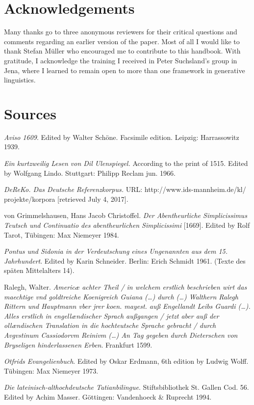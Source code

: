 \documentclass[output=paper
                ,modfonts
                ,nonflat
	        ,collection
	        ,collectionchapter
	        ,collectiontoclongg
 	        ,biblatex
                ,babelshorthands
                ,newtxmath
                ,draftmode
                ,colorlinks, citecolor=brown
]{./langsci/langscibook}
\begin{document}
\section*{Acknowledgements}
Many thanks go to three anonymous reviewers for their critical questions and comments regarding an earlier version of the paper. Most of all I would like to thank Stefan Müller who encouraged me to contribute to this handbook. With gratitude, I acknowledge the training I received in Peter Suchsland's group in Jena, where I learned to remain open to more than one framework in generative linguistics.

\section*{Sources}
\begin{description}
\setlength{\itemsep}{0pt}
\item \textit{Aviso 1609}. Edited by Walter Schöne. Facsimile edition. Leipzig: Harrassowitz 1939.
\item \textit{Ein kurtzweilig Lesen von Dil Ulenspiegel.} According to the print of 1515. Edited by Wolfgang Lindo. Stuttgart: Philipp Reclam jun. 1966.
\item \textit{DeReKo. Das Deutsche Referenzkorpus.} URL: http://www.ids-mannheim.de/kl/\\projekte/korpora [retrieved July 4, 2017].
\item von Grimmelshausen, Hans Jacob Christoffel. \textit{Der Abentheurliche Simplicissimus Teutsch und Continuatio des abentheurlichen Simplicissimi} [1669]. Edited by Rolf Tarot, Tübingen: Max Niemeyer 1984.
\item \textit{Pontus und Sidonia in der Verdeutschung eines Ungenannten aus dem 15. Jahrhundert}. Edited by Karin Schneider. Berlin: Erich Schmidt 1961. (Texte des späten Mittelalters 14).
\item Ralegh, Walter. \textit{Americæ achter Theil / in welchem erstlich beschrieben wirt das maechtige vnd goldtreiche Koenigreich Guiana (\dots) durch (\dots) Walthern Ralegh Rittern und Hauptmann vber jrer koen. mayest. auß Engellandt Leibs Guardi (\dots). Alles erstlich in engellændischer Sprach außgangen / jetzt aber auß der ollændischen Translation in die hochteutsche Sprache gebracht / durch Avgvstinum Cassiodorvm Reinivm (\dots) An Tag gegeben durch Dieterschen von Bryseligen hinderlassenen Erben}. Frankfurt 1599.
\item \textit{Otfrids Evangelienbuch}. Edited by Oskar Erdmann, 6th edition by Ludwig Wolff. Tübingen: Max Niemeyer 1973.
\item \textit{Die lateinisch-althochdeutsche Tatianbilingue}. Stiftsbibliothek St. Gallen Cod. 56. Edited by Achim Masser. Göttingen: Vandenhoeck \& Ruprecht 1994.
\end{description}

{\sloppy
\printbibliography[heading=subbibliography,notkeyword=this]
}
\end{document}
